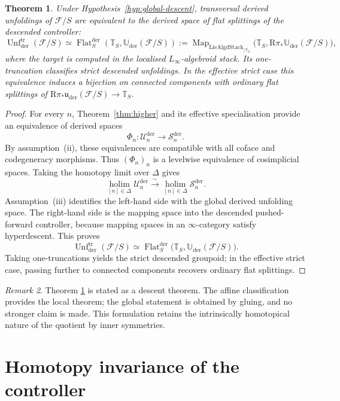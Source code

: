 \documentclass[11pt,reqno,a4paper,dvipsnames,x11names]{amsart}
\numberwithin{equation}{section}
\theoremstyle{plain}
\newtheorem{theorem}{Theorem}[section]
\theoremstyle{definition}
\theoremstyle{remark}
\newtheorem{remark}[theorem]{Remark}
\DeclareMathOperator{\Map}{Map}
\newcommand{\cF}{\mathcal F}
\newcommand{\uuder}{\mathfrak u_{\mathrm{der}}}
\newcommand{\Uder}{\mathbb U_{\mathrm{der}}}
\newcommand{\bbT}{\mathbb T}
\newcommand{\tr}{\mathrm{tr}}
\newcommand{\from}{\colon}
\begin{document}
\begin{theorem}\label{thm:intrinsic}
Under Hypothesis~\ref{hyp:global-descent}, transversal derived unfoldings of \(\cF/S\) are equivalent to the derived space of flat splittings of the descended controller:
\[
 \operatorname{Unf}^{\tr}_{\mathrm{der}}(\cF/S)
 \simeq
 \operatorname{Flat}^{\mathrm{der}}_S(\bbT_S,\Uder(\cF/S))
 :=
 \Map_{\mathrm{LieAlgdStack}_{/\bbT_S}}
 \bigl(\bbT_S,\mathrm R\pi_*\Uder(\cF/S)\bigr),
\]
where the target is computed in the localised \(L_\infty\)-algebroid stack. Its one-truncation classifies strict descended unfoldings. In the effective strict case this equivalence induces a bijection on connected components with ordinary flat splittings of \(\mathrm R\pi_*\uuder(\cF/S)\to\bbT_S\).
\end{theorem}

\begin{proof}
For every \(n\), Theorem~\ref{thm:higher} and its effective specialisation provide an equivalence of derived spaces
\[
 \Phi_n\from \mathcal U_n^{\mathrm{der}}
 \longrightarrow \mathcal S_n^{\mathrm{der}}.
\]
By assumption~(ii), these equivalences are compatible with all coface and codegeneracy morphisms. Thus
\((\Phi_n)_n\) is a levelwise equivalence of cosimplicial spaces. Taking the homotopy limit over \(\Delta\) gives
\[
 \operatorname*{holim}_{[n]\in\Delta}
 \mathcal U_n^{\mathrm{der}}
 \xrightarrow{\ \sim\ }
 \operatorname*{holim}_{[n]\in\Delta}
 \mathcal S_n^{\mathrm{der}}.
\]
Assumption~(iii) identifies the left-hand side with the global derived unfolding space. The right-hand side is the mapping space into the descended pushed-forward controller, because mapping spaces in an \(\infty\)-category satisfy hyperdescent. This proves
\[
 \operatorname{Unf}^{\tr}_{\mathrm{der}}(\cF/S)
 \simeq
 \operatorname{Flat}^{\mathrm{der}}_S
 \bigl(\bbT_S,\Uder(\cF/S)\bigr).
\]
Taking one-truncations yields the strict descended groupoid; in the effective strict case, passing further to connected components recovers ordinary flat splittings.
\end{proof}

\begin{remark}
Theorem \ref{thm:intrinsic} is stated as a descent theorem. The affine classification provides the local theorem; the global statement is obtained by gluing, and no stronger claim is made. This formulation retains the intrinsically homotopical nature of the quotient by inner symmetries.
\end{remark}


\section{Homotopy invariance of the controller}\label{sec:homotopy-invariance}
\end{document}
